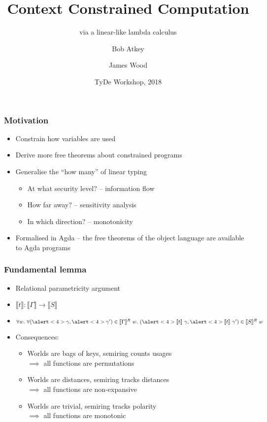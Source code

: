 \documentclass{beamer}
\title{Context Constrained Computation}
\subtitle{via a linear-like lambda calculus}
\author{Bob Atkey\inst{1} \and James Wood\inst{1}}
\institute{\inst{1}University of Strathclyde}
\date{TyDe Workshop, 2018}
\begin{document}
  \frame{\titlepage}
  \begin{frame}
    \frametitle{Motivation}

    \begin{itemize}
    \item Constrain how variables are used
    \item Derive more free theorems about constrained programs
    \item Generalise the ``how many'' of linear typing \pause
      \begin{itemize}
      \item At what security level? -- information flow \pause
      \item How far away? -- sensitivity analysis \pause
      \item In which direction? -- monotonicity \pause
      \end{itemize}
    \item Formalised in Agda -- the free theorems of the object language are
      available to Agda programs
    \end{itemize}
  \end{frame}
  \begin{frame}
    \frametitle{Fundamental lemma}
    \begin{itemize}
    \item<1-> Relational parametricity argument
    \item<2-> $\llbracket t \rrbracket : \llbracket \Gamma \rrbracket \to
      \llbracket S \rrbracket$
    \item<3-> $\forall w.~\forall(\alert<4>{\gamma}, \alert<4>{\gamma'}) \in \llbracket \Gamma
      \rrbracket^R~w.~(\alert<4>{\llbracket t \rrbracket~\gamma}, \alert<4>{\llbracket t
      \rrbracket~\gamma'}) \in \llbracket S \rrbracket^R~w$
    \item<5-> Consequences:
      \begin{itemize}
      \item Worlds are bags of keys, semiring counts usages \\
        $\implies$ all functions are permutations
      \item Worlds are distances, semiring tracks distances \\
        $\implies$ all functions are non-expansive
      \item Worlds are trivial, semiring tracks polarity \\
        $\implies$ all functions are monotonic
      \end{itemize}
    \end{itemize}
  \end{frame}
\end{document}
